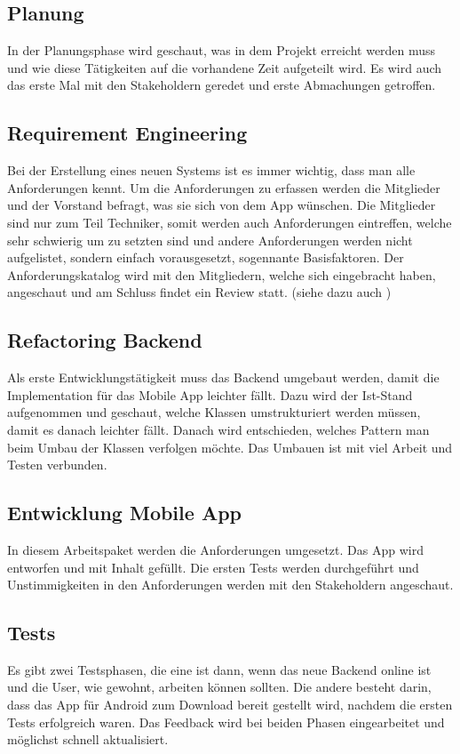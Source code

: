 \subsection{Planung}\label{planung}
In der Planungsphase wird geschaut, was in dem Projekt erreicht werden muss und wie diese Tätigkeiten auf die vorhandene Zeit aufgeteilt wird. Es wird auch das erste Mal mit den Stakeholdern geredet und erste Abmachungen getroffen.

\subsection{Requirement Engineering}\label{rqe}
Bei der Erstellung eines neuen Systems ist es immer wichtig, dass man alle Anforderungen kennt. Um die Anforderungen zu erfassen werden die Mitglieder und der Vorstand befragt, was sie sich von dem App wünschen. Die Mitglieder sind nur zum Teil Techniker, somit werden auch Anforderungen eintreffen, welche sehr schwierig um zu setzten sind und andere Anforderungen werden nicht aufgelistet, sondern einfach vorausgesetzt, sogennante Basisfaktoren. Der Anforderungskatalog wird mit den Mitgliedern, welche sich eingebracht haben, angeschaut und am Schluss findet ein Review statt. (siehe dazu auch \cite{req_eng_book})

\subsection{Refactoring Backend}\label{ref_backend}
Als erste Entwicklungstätigkeit muss das Backend umgebaut werden, damit die Implementation für das Mobile App leichter fällt. Dazu wird der Ist-Stand aufgenommen und geschaut, welche Klassen umstrukturiert werden müssen, damit es danach leichter fällt. Danach wird entschieden, welches Pattern man beim Umbau der Klassen verfolgen möchte. Das Umbauen ist mit viel Arbeit und Testen verbunden.

\subsection{Entwicklung Mobile App}\label{eng_app}
In diesem Arbeitspaket werden die Anforderungen umgesetzt. Das App wird entworfen und mit Inhalt gefüllt. Die ersten Tests werden durchgeführt und Unstimmigkeiten in den Anforderungen werden mit den Stakeholdern angeschaut.

\subsection{Tests}\label{tests}
Es gibt zwei Testsphasen, die eine ist dann, wenn das neue Backend online ist und die User, wie gewohnt, arbeiten können sollten. Die andere besteht darin, dass  das App für Android zum Download bereit gestellt wird, nachdem die ersten Tests erfolgreich waren.  Das Feedback wird bei beiden Phasen eingearbeitet und möglichst schnell aktualisiert.

